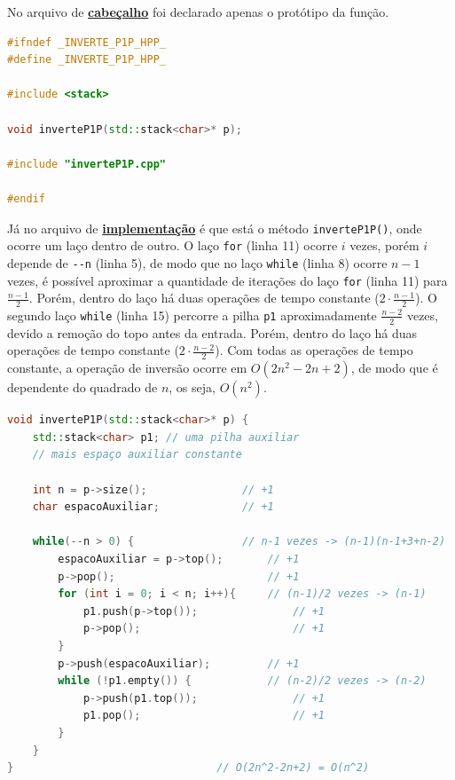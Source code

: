 \documentclass[
  brazilian,
  paper=a4,
  oneside  ,captions=tableheading
]{scrbook}
\newcommand{\passthrough}[1]{#1}
\begin{document}
No arquivo de
\href{https://github.com/ecostadelle/lista_pilhas_filas/blob/main/include/inverteP1P.hpp}{\textbf{cabeçalho}}
foi declarado apenas o protótipo da função.

\begin{lstlisting}[language={C++}]
#ifndef _INVERTE_P1P_HPP_
#define _INVERTE_P1P_HPP_

#include <stack>

void inverteP1P(std::stack<char>* p);

#include "inverteP1P.cpp"

#endif
\end{lstlisting}

Já no arquivo de
\href{https://github.com/ecostadelle/lista_pilhas_filas/blob/main/include/inverteP1P.cpp}{\textbf{implementação}}
é que está o método \passthrough{\lstinline!inverteP1P()!}, onde ocorre
um laço dentro de outro. O laço \passthrough{\lstinline!for!} (linha 11)
ocorre \(i\) vezes, porém \(i\) depende de \passthrough{\lstinline!--n!}
(linha 5), de modo que no laço \passthrough{\lstinline!while!} (linha 8)
ocorre \(n-1\) vezes, é possível aproximar a quantidade de iterações do
laço \passthrough{\lstinline!for!} (linha 11) para \(\frac{n-1}{2}\).
Porém, dentro do laço há duas operações de tempo constante
(\(2 \cdot \frac{n-1}{2}\)). O segundo laço
\passthrough{\lstinline!while!} (linha 15) percorre a pilha
\passthrough{\lstinline!p1!} aproximadamente \(\frac{n-2}{2}\) vezes,
devido a remoção do topo antes da entrada. Porém, dentro do laço há duas
operações de tempo constante (\(2 \cdot \frac{n-2}{2}\)). Com todas as
operações de tempo constante, a operação de inversão ocorre em
\(O(2n^2-2n+2)\), de modo que é dependente do quadrado de \(n\), os
seja, \(O(n^2)\).

\begin{lstlisting}[language={C++}]
void inverteP1P(std::stack<char>* p) { 
    std::stack<char> p1; // uma pilha auxiliar 
    // mais espaço auxiliar constante 

    int n = p->size();               // +1 
    char espacoAuxiliar;             // +1

    while(--n > 0) {                 // n-1 vezes -> (n-1)(n-1+3+n-2) 
        espacoAuxiliar = p->top();       // +1
        p->pop();                        // +1
        for (int i = 0; i < n; i++){     // (n-1)/2 vezes -> (n-1)
            p1.push(p->top());               // +1
            p->pop();                        // +1
        }
        p->push(espacoAuxiliar);         // +1
        while (!p1.empty()) {            // (n-2)/2 vezes -> (n-2)
            p->push(p1.top());               // +1
            p1.pop();                        // +1
        }
    }
}                                // O(2n^2-2n+2) = O(n^2)
\end{lstlisting}
\end{document}
